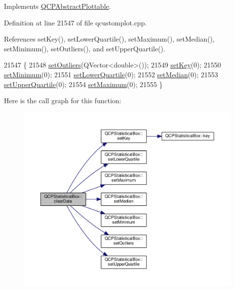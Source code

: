 Implements \hyperlink{class_q_c_p_abstract_plottable_a86e5b8fd4b6ff4f4084e7ea4c573fc53}{Q\+C\+P\+Abstract\+Plottable}.



Definition at line 21547 of file qcustomplot.\+cpp.



References set\+Key(), set\+Lower\+Quartile(), set\+Maximum(), set\+Median(), set\+Minimum(), set\+Outliers(), and set\+Upper\+Quartile().


\begin{DoxyCode}
21547                                   \{
21548   \hyperlink{class_q_c_p_statistical_box_af9bc09620e0bf93bf444ee35e5800d1d}{setOutliers}(QVector<double>());
21549   \hyperlink{class_q_c_p_statistical_box_a84a1c6d34b2f9af40bca0c527d51e97e}{setKey}(0);
21550   \hyperlink{class_q_c_p_statistical_box_a84ff7cc61ba44890f0c3e0c99c19941e}{setMinimum}(0);
21551   \hyperlink{class_q_c_p_statistical_box_a680941af5e23d902013962fa67223f9e}{setLowerQuartile}(0);
21552   \hyperlink{class_q_c_p_statistical_box_a65970e77a897da4ecb4b15300868aad3}{setMedian}(0);
21553   \hyperlink{class_q_c_p_statistical_box_a65a1375f941c5a2077b5201229e89346}{setUpperQuartile}(0);
21554   \hyperlink{class_q_c_p_statistical_box_acec5ad1901f00f2c5387cfb4d9787eb3}{setMaximum}(0);
21555 \}
\end{DoxyCode}


Here is the call graph for this function\+:\nopagebreak
\begin{figure}[H]
\begin{center}
\leavevmode
\includegraphics[width=350pt]{class_q_c_p_statistical_box_a19112994449df0c20287858436cc68e3_cgraph}
\end{center}
\end{figure}


